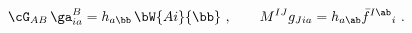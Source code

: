 \begin{equation}
  \cG_{AB}\, \ga_{ia}^B = h_{a\bb}\, \bW{Ai}{\bb}\ ,\qquad M^{IJ}
  g_{Jia} = h_{a\ab} \bar{f}^{I\ab}{}_i\ .
 \end{equation}


